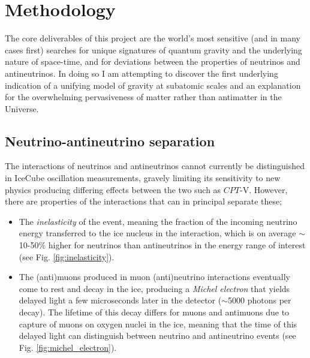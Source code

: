\documentclass[a4paper,11pt]{article}
\begin{document}
\section{Methodology}
\vspace{0.1 cm}



The core deliverables of this project are the world's most sensitive (and in many cases first) searches for unique signatures of quantum gravity and the underlying nature of space-time, and for deviations between the properties of neutrinos and antineutrinos. In doing so I am attempting to discover the first underlying indication of a unifying model of gravity at subatomic scales and an explanation for the overwhelming pervasiveness of matter rather than antimatter in the Universe. \\


\subsection{Neutrino-antineutrino separation}


The interactions of neutrinos and antineutrinos cannot currently be distinguished in IceCube oscillation measurements, gravely limiting its sensitivity to new physics producing differing effects between the two such as $CPT$-V. However, there are properties of the interactions that can in principal separate these;

\begin{itemize}
    \item The \textit{inelasticity} of the event, meaning the fraction of the incoming neutrino energy transferred to the ice nucleus in the interaction, which is on average $\sim$10-50\%  higher for neutrinos than antineutrinos in the energy range of interest (see Fig. \ref{fig:inelasticity}).
    \item The (anti)muons produced in muon (anti)neutrino interactions eventually come to rest and decay in the ice, producing a \textit{Michel electron} that yields delayed light a few microseconds later in the detector ($\sim$5000 photons per decay). The lifetime of this decay differs for muons and antimuons due to capture of muons on oxygen nuclei in the ice, meaning that the time of this delayed light can distinguish between neutrino and antineutrino events (see Fig. \ref{fig:michel_electron}). 
\end{itemize}
\end{document}
